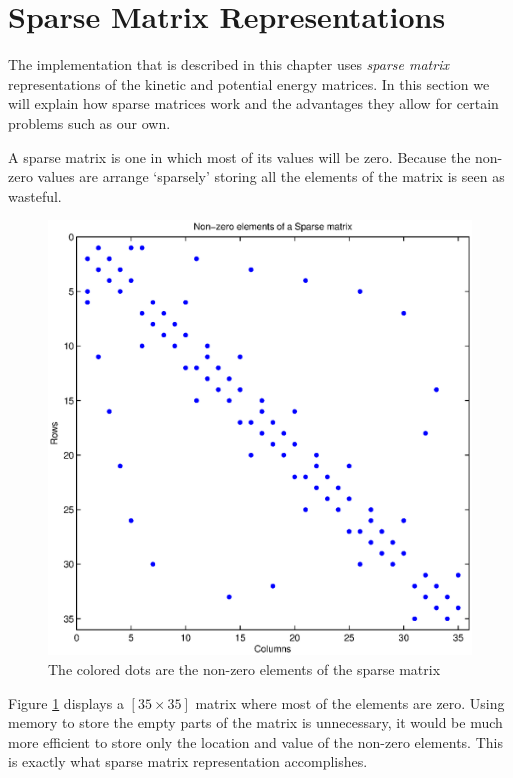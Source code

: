 \documentclass[authoryearcitations]{UoYCSproject}
\begin{document}
\section{Sparse Matrix Representations}
\label{sec:sparse}
The implementation that is described in this chapter uses \emph{sparse matrix} representations of the
kinetic and potential energy matrices. In this section we will explain how sparse matrices work and the advantages
they allow for certain problems such as our own. 

A sparse matrix is one in which most of its values will be zero. Because the non-zero values are arrange `sparsely'
storing all the elements of the matrix is seen as wasteful. 

\begin{figure}
\centering
\includegraphics[scale=0.5]{figures/sparseVisual.eps}
\caption{The colored dots are the non-zero elements of the sparse matrix}
\label{sparseExample}
\end{figure}

Figure \ref{sparseExample} displays a $[35 \times 35]$ matrix where most of the elements are zero. Using memory
to store the empty parts of the matrix is unnecessary, it would be much more efficient to store only the location 
and value of the non-zero elements. This is exactly what sparse matrix representation accomplishes. 
\end{document}
